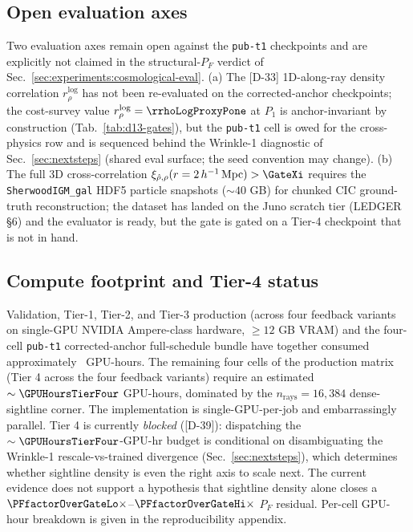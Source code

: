\subsection{Open evaluation axes}
\label{sec:experiments:open-axes}
Two evaluation axes remain open against the \texttt{pub-t1} checkpoints and are explicitly not claimed in the structural-$P_F$ verdict of Sec.~\ref{sec:experiments:cosmological-eval}. (a) The [D-33] 1D-along-ray density correlation $r_\rho^{\log}$ has not been re-evaluated on the corrected-anchor checkpoints; the cost-survey value $r_\rho^{\log}=\rrhoLogProxyPone$ at $P_1$ is anchor-invariant by construction (Tab.~\ref{tab:d13-gates}), but the \texttt{pub-t1} cell is owed for the cross-physics row and is sequenced behind the Wrinkle-1 diagnostic of Sec.~\ref{sec:nextsteps} (shared eval surface; the seed convention may change). (b) The full 3D cross-correlation $\xi_{\hat\rho,\rho}(r=2\,h^{-1}\,\text{Mpc}) > \GateXi$ requires the \texttt{SherwoodIGM\_gal} HDF5 particle snapshots ($\sim 40$ GB) for chunked CIC ground-truth reconstruction; the dataset has landed on the Juno scratch tier (LEDGER \S6) and the evaluator is ready, but the gate is gated on a Tier-4 checkpoint that is not in hand.

\subsection{Compute footprint and Tier-4 status}
\label{sec:experiments:compute}
Validation, Tier-1, Tier-2, and Tier-3 production (across four feedback variants on single-GPU NVIDIA Ampere-class hardware, $\geq 12$ GB VRAM) and the four-cell \texttt{pub-t1} corrected-anchor full-schedule bundle have together consumed approximately \GPUHoursSpent\ GPU-hours. The remaining four cells of the production matrix (Tier 4 across the four feedback variants) require an estimated $\sim \GPUHoursTierFour$ GPU-hours, dominated by the $n_{\text{rays}} = 16{,}384$ dense-sightline corner. The implementation is single-GPU-per-job and embarrassingly parallel. Tier 4 is currently \emph{blocked} ([D-39]): dispatching the $\sim \GPUHoursTierFour$-GPU-hr budget is conditional on disambiguating the Wrinkle-1 rescale-vs-trained divergence (Sec.~\ref{sec:nextsteps}), which determines whether sightline density is even the right axis to scale next. The current evidence does not support a hypothesis that sightline density alone closes a $\PFfactorOverGateLo\times$--$\PFfactorOverGateHi\times$ $P_F$ residual. Per-cell GPU-hour breakdown is given in the reproducibility appendix.
